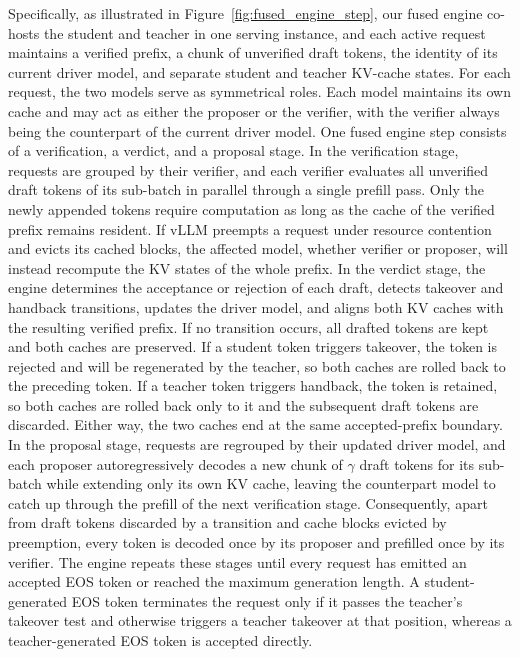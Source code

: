 \documentclass{article} %
\begin{document}
Specifically, as illustrated in Figure~\ref{fig:fused_engine_step}, our fused engine co-hosts the student and teacher in one serving instance, and each active request maintains a verified prefix, a chunk of unverified draft tokens, the identity of its current driver model, and separate student and teacher KV-cache states. 
For each request, the two models serve as symmetrical roles. Each model maintains its own cache and may act as either the proposer or the verifier, with the verifier always being the counterpart of the current driver model.
One fused engine step consists of a verification, a verdict, and a proposal stage. In the verification stage, requests are grouped by their verifier, and each verifier evaluates all unverified draft tokens of its sub-batch in parallel through a single prefill pass. Only the newly appended tokens require computation as long as the cache of the verified prefix remains resident. If vLLM preempts a request under resource contention and evicts its cached blocks, the affected model, whether verifier or proposer, will instead recompute the KV states of the whole prefix. 
In the verdict stage, the engine determines the acceptance or rejection of each draft, detects takeover and handback transitions, updates the driver model, and aligns both KV caches with the resulting verified prefix. If no transition occurs, all drafted tokens are kept and both caches are preserved. If a student token triggers takeover, the token is rejected and will be regenerated by the teacher, so both caches are rolled back to the preceding token. If a teacher token triggers handback, the token is retained, so both caches are rolled back only to it and the subsequent draft tokens are discarded. Either way, the two caches end at the same accepted-prefix boundary. 
In the proposal stage, requests are regrouped by their updated driver model, and each proposer autoregressively decodes a new chunk of $\gamma$ draft tokens for its sub-batch while extending only its own KV cache, leaving the counterpart model to catch up through the prefill of the next verification stage. Consequently, apart from draft tokens discarded by a transition and cache blocks evicted by preemption, every token is decoded once by its proposer and prefilled once by its verifier. The engine repeats these stages until every request has emitted an accepted EOS token or reached the maximum generation length. A student-generated EOS token terminates the request only if it passes the teacher's takeover test and otherwise triggers a teacher takeover at that position, whereas a teacher-generated EOS token is accepted directly.
\end{document}
